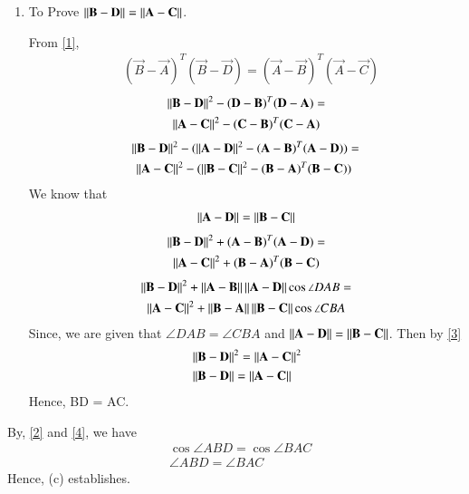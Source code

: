 \documentclass[journal,12pt,twocolumn]{IEEEtran}
\begin{document}
\begin{enumerate}
\item To Prove $\left\lVert\mathbf{B} - \mathbf{D}\right\rVert = \left\lVert\mathbf{A} - \mathbf{C}\right\rVert$. 

From \eqref{1},
\begin{align}
	& (\vec B -\vec A)^T(\vec{B}-\vec{D}) = (\vec A -\vec B)^T(\vec{A}-\vec{C})
\end{align}
\begin{multline}
\left\lVert\mathbf{B}-\mathbf{D}\right\rVert^2 - (\mathbf D -\mathbf B)^T(\mathbf{D}-\mathbf{A})= \\ \left\lVert\mathbf{A}-\mathbf{C}\right\rVert^2 - (\mathbf C -\mathbf B)^T(\mathbf{C}-\mathbf{A})	
\end{multline}
\begin{multline}
 \norm{\vec{B}-\vec{D}}^2 - (\norm{\vec{A}-\vec{D}}^2 - (\vec A -\vec B)^T(\vec A -\vec D))   = \\
 \norm{\vec{A}-\vec{C}}^2 - (\norm{\vec{B}-\vec{C}}^2 - (\vec B -\vec A)^T(\vec B -\vec C))\	
\end{multline}
We know that
\begin{align}
	\left\lVert\mathbf{A}-\mathbf{D}\right\rVert =  \left\lVert\mathbf{B}-\mathbf{C}\right\rVert 
\end{align}
\begin{multline}
\left\lVert\mathbf{B}-\mathbf{D}\right\rVert^2 + (\mathbf A -\mathbf B)^T(\mathbf{A}-\mathbf{D}) = \\ \left\lVert\mathbf{A}-\mathbf{C}\right\rVert^2 + (\mathbf B -\mathbf A)^T(\mathbf{B}-\mathbf{C}) 	
\end{multline}
\begin{multline}
\left\lVert\mathbf{B}-\mathbf{D}\right\rVert^2 + \left\lVert\mathbf{A}-\mathbf{B}\right\rVert\left\lVert\mathbf{A}-\mathbf{D}\right\rVert\cos \angle DAB = \\
 \left\lVert\mathbf{A}-\mathbf{C}\right\rVert^2 + \left\lVert\mathbf{B}-\mathbf{A}\right\rVert\left\lVert\mathbf{B}-\mathbf{C}\right\rVert\cos \angle CBA \label{3}	
\end{multline}
Since, we are given that $\angle DAB = \angle CBA$ and $\left\lVert\mathbf{A}-\mathbf{D}\right\rVert = \left\lVert\mathbf{B}-\mathbf{C}\right\rVert$. Then by \eqref{3}
\begin{align}
	& \left\lVert\mathbf{B}-\mathbf{D}\right\rVert^2 = \left\lVert\mathbf{A}-\mathbf{C}\right\rVert^2 \\
	& \label{4}\left\lVert\mathbf{B}-\mathbf{D}\right\rVert = \left\lVert\mathbf{A}-\mathbf{C}\right\rVert
\end{align}
Hence, BD = AC.
\end{enumerate}
By, \eqref{2} and \eqref{4}, we have
\begin{align}
	& \cos\angle ABD = \cos\angle BAC \\
	& \angle ABD = \angle BAC
\end{align}
Hence, (c) establishes.
\end{document}

